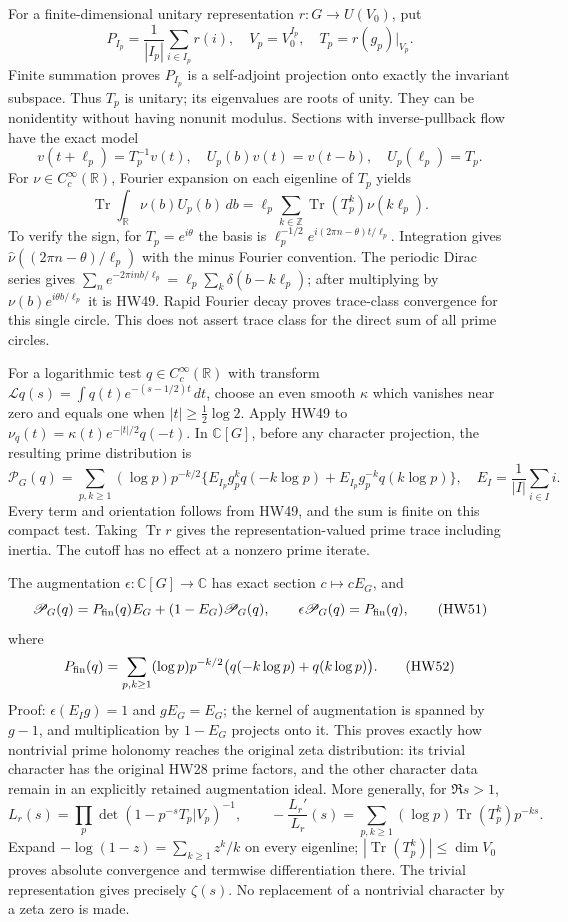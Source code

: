 \documentclass[11pt]{article}
\newcommand{\C}{\mathbb C}
\newcommand{\R}{\mathbb R}
\newcommand{\Z}{\mathbb Z}
\newcommand{\tr}{\operatorname{Tr}}
\begin{document}
For a finite-dimensional unitary representation \(r:G\to U(V_0)\),
put
\[
 P_{I_p}=\frac1{|I_p|}\sum_{i\in I_p}r(i),\quad
 V_p=V_0^{I_p},\quad T_p=r(g_p)|_{V_p}.
 \tag{HW47}
\]
Finite summation proves \(P_{I_p}\) is a self-adjoint
projection onto exactly the invariant subspace.
Thus \(T_p\) is unitary; its eigenvalues are roots of unity.
They can be nonidentity without having nonunit modulus.
Sections with inverse-pullback flow have the exact model
\[
 v(t+\ell_p)=T_p^{-1}v(t),\quad
 U_p(b)v(t)=v(t-b),\quad U_p(\ell_p)=T_p.
 \tag{HW48}
\]
For \(\nu\in C_c^\infty(\R)\), Fourier expansion on each
eigenline of \(T_p\) yields
\[
 \tr\int_\R\nu(b)U_p(b)\,db
  =\ell_p\sum_{k\in\Z}\tr(T_p^k)\nu(k\ell_p).
 \tag{HW49}
\]
To verify the sign, for \(T_p=e^{i\theta}\) the basis is
\(\ell_p^{-1/2}e^{i(2\pi n-\theta)t/\ell_p}\).
Integration gives \(\widehat\nu((2\pi n-\theta)/\ell_p)\)
with the minus Fourier convention. The periodic Dirac
series gives
\(\sum_n e^{-2\pi inb/\ell_p}
       =\ell_p\sum_k\delta(b-k\ell_p)\);
after multiplying by \(\nu(b)e^{i\theta b/\ell_p}\) it is
HW49. Rapid Fourier decay proves trace-class convergence
for this single circle. This does not assert trace class
for the direct sum of all prime circles.

For a logarithmic test \(q\in C_c^\infty(\R)\) with transform
\(\mathcal Lq(s)=\int q(t)e^{-(s-1/2)t}\,dt\),
choose an even smooth \(\kappa\) which vanishes near zero
and equals one when \(|t|\ge\frac12\log2\).
Apply HW49 to
\(\nu_q(t)=\kappa(t)e^{-|t|/2}q(-t)\).
In \(\C[G]\), before any character projection, the resulting
prime distribution is
\[
 \mathscr P_G(q)=
  \sum_{p,k\ge1}(\log p)p^{-k/2}
    \{E_{I_p}g_p^kq(-k\log p)
          +E_{I_p}g_p^{-k}q(k\log p)\},
 \quad E_I=\frac1{|I|}\sum_{i\in I}i .
 \tag{HW50}\label{hw:groupdistribution}
\]
Every term and orientation follows from HW49, and the sum
is finite on this compact test. Taking \(\tr r\) gives
the representation-valued prime trace including inertia.
The cutoff has no effect at a nonzero prime iterate.

The augmentation \(\epsilon:\C[G]\to\C\) has exact section
\(c\mapsto cE_G\), and
\[
 \mathscr P_G(q)
 =P_{\rm fin}(q)E_G+(1-E_G)\mathscr P_G(q),\qquad
 \epsilon\mathscr P_G(q)=P_{\rm fin}(q),
 \tag{HW51}
\]
where
\[
 P_{\rm fin}(q)=
 \sum_{p,k\ge1}(\log p)p^{-k/2}
             \bigl(q(-k\log p)+q(k\log p)\bigr).
 \tag{HW52}
\]
Proof: \(\epsilon(E_Ig)=1\) and \(gE_G=E_G\);
the kernel of augmentation is spanned by \(g-1\), and
multiplication by \(1-E_G\) projects onto it.
This proves exactly how nontrivial prime holonomy reaches
the original zeta distribution: its trivial character has
the original HW28 prime factors, and the other character
data remain in an explicitly retained augmentation ideal.
More generally, for \(\Re s>1\),
\[
 L_r(s)=\prod_p\det(1-p^{-s}T_p|V_p)^{-1},\qquad
 -\frac{L_r'}{L_r}(s)
  =\sum_{p,k\ge1}(\log p)\tr(T_p^k)p^{-ks}.
 \tag{HW53}
\]
Expand \(-\log(1-z)=\sum_{k\ge1}z^k/k\) on every
eigenline; \(|\tr(T_p^k)|\le\dim V_0\) proves absolute
convergence and termwise differentiation there.
The trivial representation gives precisely \(\zeta(s)\).
No replacement of a nontrivial character by a zeta zero
is made.
\end{document}
